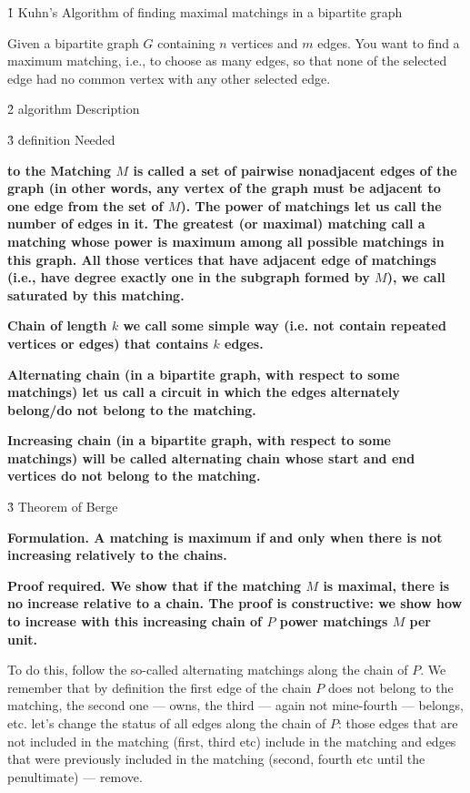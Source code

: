 \h1{ Kuhn's Algorithm of finding maximal matchings in a bipartite graph }

Given a bipartite graph $G$ containing $n$ vertices and $m$ edges. You want to find a maximum matching, i.e., to choose as many edges, so that none of the selected edge had no common vertex with any other selected edge.


\h2{ algorithm Description }


\h3{ definition Needed }

\bf{to the Matching} $M$ is called a set of pairwise nonadjacent edges of the graph (in other words, any vertex of the graph must be adjacent to one edge from the set of $M$). The power of matchings let us call the number of edges in it. The greatest (or maximal) matching call a matching whose power is maximum among all possible matchings in this graph. All those vertices that have adjacent edge of matchings (i.e., have degree exactly one in the subgraph formed by $M$), we call saturated by this matching.

\bf{Chain} of length $k$ we call some simple way (i.e. not contain repeated vertices or edges) that contains $k$ edges.

\bf{Alternating chain} (in a bipartite graph, with respect to some matchings) let us call a circuit in which the edges alternately belong/do not belong to the matching.

\bf{Increasing chain} (in a bipartite graph, with respect to some matchings) will be called alternating chain whose start and end vertices do not belong to the matching.


\h3{ Theorem of Berge }

\bf{Formulation}. A matching is maximum if and only when there is not increasing relatively to the chains.

\bf{Proof required}. We show that if the matching $M$ is maximal, there is no increase relative to a chain. The proof is constructive: we show how to increase with this increasing chain of $P$ power matchings $M$ per unit.

To do this, follow the so-called alternating matchings along the chain of $P$. We remember that by definition the first edge of the chain $P$ does not belong to the matching, the second one --- owns, the third --- again not mine-fourth --- belongs, etc. let's change the status of all edges along the chain of $P$: those edges that are not included in the matching (first, third etc) include in the matching and edges that were previously included in the matching (second, fourth etc until the penultimate) --- remove.

